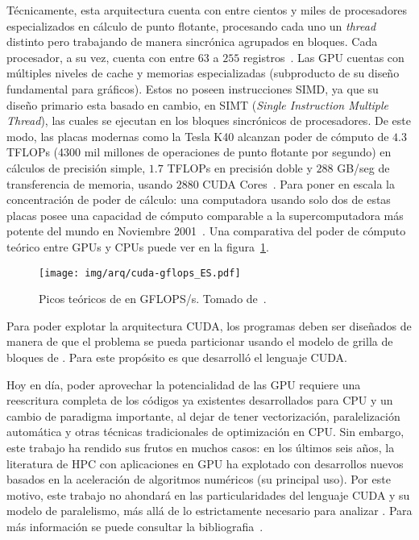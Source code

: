 T\'ecnicamente, esta arquitectura cuenta con entre cientos y miles de procesadores especializados en c\'alculo de punto flotante, procesando cada uno un \textit{thread} distinto pero
trabajando de manera sincr\'onica agrupados en bloques.
Cada procesador, a su vez, cuenta con entre $63$ a $255$ registros~\cite{NvidiaFermi,NvidiaKepler}.
Las GPU cuentas con m\'ultiples niveles de cache y memorias especializadas (subproducto de su dise\~no fundamental para gr\'aficos).
Estos no poseen instrucciones SIMD, ya que su dise\~no primario esta basado en cambio, en SIMT (\textit{Single Instruction Multiple Thread}), las cuales se ejecutan en los bloques sincr\'onicos de procesadores.
De este modo, las placas modernas como la \nvidia{} Tesla K40 alcanzan poder de c\'omputo de $4.3$ TFLOPs (4300 mil millones de operaciones de punto flotante por segundo) en c\'alculos de precisi\'on simple, $1.7$ TFLOPs en precisi\'on doble y $288$ GB/seg de transferencia de memoria, usando $2880$ CUDA Cores~\cite{NvidiaKeplerDatasheet}.
Para poner en escala la concentraci\'on de poder de c\'alculo: una computadora usando solo dos de estas placas posee una capacidad
de c\'omputo comparable a la supercomputadora m\'as potente del mundo en Noviembre 2001~\cite{Top500November2001}.
Una comparativa del poder de c\'omputo te\'orico entre GPUs y CPUs puede ver en la figura~\ref{fig:cuda-gflops}.

\begin{figure}[htbp]
    \centering
    \texttt{[image: img/arq/cuda-gflops\_ES.pdf]}
    \caption{Picos te\'oricos de \performance{} en GFLOPS/s. Tomado de~\cite{cudaProgrammingGuide}.}
    \label{fig:cuda-gflops}
\end{figure}

Para poder explotar la arquitectura CUDA, los programas deben ser dise\~nados de manera de que el problema se pueda particionar usando el modelo de grilla de bloques de \threads{}.
Para este prop\'osito es que \nvidia{} desarroll\'o el lenguaje CUDA.

Hoy en d\'ia, poder aprovechar la potencialidad de las GPU requiere una reescritura completa de los c\'odigos ya existentes desarrollados para CPU y un cambio de paradigma importante, al dejar de tener vectorizaci\'on, paralelizaci\'on autom\'atica y otras t\'ecnicas tradicionales de optimizaci\'on en CPU.
Sin embargo, este trabajo ha rendido sus frutos en muchos casos: en los \'ultimos seis a\~nos, la literatura de HPC con aplicaciones en GPU ha explotado con desarrollos nuevos basados en la aceleraci\'on de algoritmos num\'ericos (su principal uso). Por este motivo, este trabajo no ahondar\'a
en las particularidades del lenguaje CUDA y su modelo de paralelismo, m\'as all\'a de lo estrictamente necesario para analizar \performance{}. Para m\'as informaci\'on se puede consultar la bibliografia~\cite{cudaHandbook,farberCuda,CudaOverview}.

